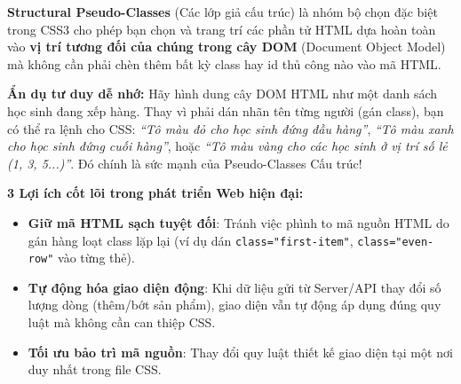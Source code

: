 \documentclass[11pt,oneside]{book}
\newcommand{\codeinline}[1]{\textcolor{accentOrange}{\texttt{#1}}}
\newcommand{\term}[1]{\textbf{\textcolor{primaryBlue}{#1}}}
\begin{document}
\begin{conceptBox}
\term{Structural Pseudo-Classes} (Các lớp giả cấu trúc) là nhóm bộ chọn đặc biệt trong CSS3 cho phép bạn chọn và trang trí các phần tử HTML dựa hoàn toàn vào \textbf{vị trí tương đối của chúng trong cây DOM} (Document Object Model) mà không cần phải chèn thêm bất kỳ class hay id thủ công nào vào mã HTML.

\par\vspace{4pt}
\textbf{ Ẩn dụ tư duy dễ nhớ:} Hãy hình dung cây DOM HTML như một danh sách học sinh đang xếp hàng. Thay vì phải dán nhãn tên từng người (gán class), bạn có thể ra lệnh cho CSS: \textit{``Tô màu đỏ cho học sinh đứng đầu hàng''}, \textit{``Tô màu xanh cho học sinh đứng cuối hàng''}, hoặc \textit{``Tô màu vàng cho các học sinh ở vị trí số lẻ (1, 3, 5...)''}. Đó chính là sức mạnh của Pseudo-Classes Cấu trúc!

\par\vspace{4pt}
\textbf{ 3 Lợi ích cốt lõi trong phát triển Web hiện đại:}
\begin{itemize}[leftmargin=1.5em, itemsep=3pt, parsep=0pt]
    \item \textbf{Giữ mã HTML sạch tuyệt đối}: Tránh việc phình to mã nguồn HTML do gán hàng loạt class lặp lại (ví dụ dán \codeinline{class="first-item"}, \codeinline{class="even-row"} vào từng thẻ).
    \item \textbf{Tự động hóa giao diện động}: Khi dữ liệu gửi từ Server/API thay đổi số lượng dòng (thêm/bớt sản phẩm), giao diện vẫn tự động áp dụng đúng quy luật mà không cần can thiệp CSS.
    \item \textbf{Tối ưu bảo trì mã nguồn}: Thay đổi quy luật thiết kế giao diện tại một nơi duy nhất trong file CSS.
\end{itemize}
\end{conceptBox}
\end{document}
